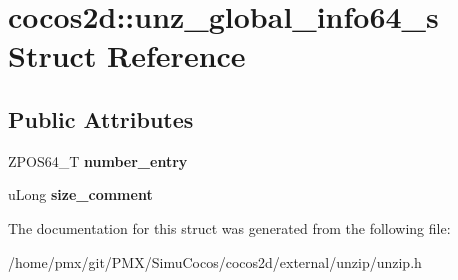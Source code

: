 \hypertarget{structcocos2d_1_1unz__global__info64__s}{}\section{cocos2d\+:\+:unz\+\_\+global\+\_\+info64\+\_\+s Struct Reference}
\label{structcocos2d_1_1unz__global__info64__s}
\subsection*{Public Attributes}
\begin{DoxyCompactItemize}
\item 
\mbox{\label{structcocos2d_1_1unz__global__info64__s_a4e2854f64e058692c34b34e00b532eb5}} 
Z\+P\+O\+S64\+\_\+T {\bfseries number\+\_\+entry}
\item 
\mbox{\label{structcocos2d_1_1unz__global__info64__s_ae05644de25a29b5943dbca7b328e9ffe}} 
u\+Long {\bfseries size\+\_\+comment}
\end{DoxyCompactItemize}


The documentation for this struct was generated from the following file\+:\begin{DoxyCompactItemize}
\item 
/home/pmx/git/\+P\+M\+X/\+Simu\+Cocos/cocos2d/external/unzip/unzip.\+h\end{DoxyCompactItemize}
